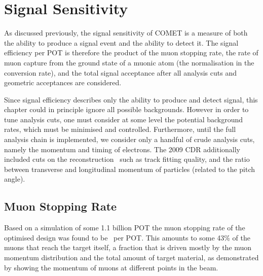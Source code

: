 
\chapter{\phaseII Signal Sensitivity}
As discussed previously, the signal sensitivity of COMET is a measure of both the ability to produce a signal event
and the ability to detect it.
The signal efficiency per \ac{POT} is therefore the product of the muon stopping rate, the rate of muon capture from the ground state of a muonic atom (the normalisation in the conversion rate), and the total signal acceptance after all analysis cuts and geometric acceptances are considered.

Since signal efficiency describes only the ability to produce and detect signal, this chapter could in principle ignore all possible backgrounds.
However in order to tune analysis cuts, one must consider at some level the potential background rates, which must be minimised and controlled.
Furthermore, until the full analysis chain is implemented, we consider only a handful of crude analysis cuts, namely the momentum and timing of electrons.
The 2009 \ac{CDR} additionally included cuts on the reconstruction~\cite{CDRphase2} such as track fitting quality, and the ratio between transverse and longitudinal momentum of particles (related to the pitch angle).

\FigSensMuMomentum
\section{Muon Stopping Rate}
Based on a simulation of some 1.1 billion \ac{POT} the muon stopping rate of the optimised design was found to be ~per \ac{POT}.
This amounts to some 43\% of the muons that reach the target itself, a fraction that is driven mostly by the muon momentum distribution and the total amount of target material, as demonstrated by 
showing the momentum of muons at different points in the beam.

